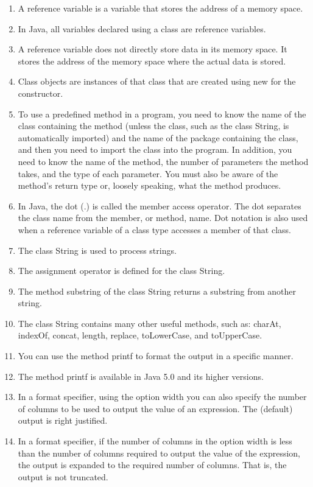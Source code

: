 \documentclass[12pt,a4paper,final,twoside,onecolumn,titlepage]{book}
\begin{document}
\begin{enumerate}
\item A reference variable is a variable that stores the address of a memory space.
\item In Java, all variables declared using a class are reference variables.
\item A reference variable does not directly store data in its memory space. It stores the address of the memory space where the actual data is stored.
\item Class objects are instances of that class that are created using new for the constructor.
\item To use a predefined method in a program, you need to know the name of the class containing the method (unless the class, such as the class String, is automatically imported) and the name of the package containing the class, and then you need to import the class into the program. In addition, you need to know the name of the method, the number of parameters the method takes, and the type of each parameter. You must also be aware of the method’s return type or, loosely speaking, what the method produces.
\item In Java, the dot (.) is called the member access operator. The dot separates the class name from the member, or method, name. Dot notation is also used when a reference variable of a class type accesses a member of that class.
\item The class String is used to process strings.
\item The assignment operator is defined for the class String.
\item The method substring of the class String returns a substring from another string.
\item The class String contains many other useful methods, such as: charAt, indexOf, concat, length, replace, toLowerCase, and toUpperCase.
\item You can use the method printf to format the output in a specific manner.
\item The method printf is available in Java 5.0 and its higher versions.
\item In a format specifier, using the option width you can also specify the number of columns to be used to output the value of an expression. The (default) output is right justified.
\item In a format specifier, if the number of columns in the option width is less than the number of columns required to output the value of the expression, the output is expanded to the required number of columns. That is, the output is not truncated.

\end{enumerate}
\end{document}
